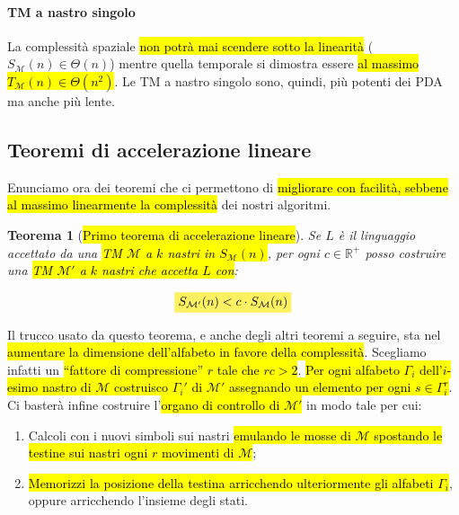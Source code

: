\documentclass[a4paper,11pt,oneside]{article}
\theoremstyle{plain}
\newtheorem{thm}{Teorema}[section]
\theoremstyle{definition}
\theoremstyle{remark}
\newcommand{\mhl}[1]{\colorbox{hlcolor}{$\displaystyle #1$}}
\begin{document}
\paragraph{TM a nastro singolo} La complessità spaziale \hl{non potrà mai
scendere sotto la linearità} ($S_\mathcal{M}(n) \in \Theta(n)$) mentre quella
temporale si dimostra essere \hl{al massimo $T_\mathcal{M}(n) \in \Theta(n^2)$}.
Le TM a nastro singolo sono, quindi, più potenti dei PDA ma anche più lente.

\subsection{Teoremi di accelerazione lineare}\label{sec:acc-lin}

Enunciamo ora dei teoremi che ci permettono di \hl{migliorare con facilità,
sebbene al massimo linearmente la complessità} dei nostri algoritmi.

\begin{thm}[\hl{Primo teorema di accelerazione lineare}]\label{thm:acc-lin-1}
  Se $L$ è il linguaggio accettato da una \hl{TM $\mathcal{M}$ a $k$ nastri in
  $S_\mathcal{M}(n)$}, per ogni $c \in \mathbb{R}^+$ posso costruire una \hl{TM
  $\mathcal{M}'$ a $k$ nastri che accetta $L$ con}:

  \begin{equation}
    \mhl{ S_{\mathcal{M}'}(n) < c \cdot S_\mathcal{M}(n) }
  \end{equation}
\end{thm}

Il trucco usato da questo teorema, e anche degli altri teoremi a seguire, sta
nel \hl{aumentare la dimensione dell'alfabeto in favore della complessità}. Scegliamo
infatti un \hl{``fattore di compressione'' $r$ tale che $rc>2$}. \hl{Per ogni alfabeto
$\Gamma_i$ dell'$i$-esimo nastro di $\mathcal{M}$ costruisco $\Gamma_i'$ di
$\mathcal{M}'$ assegnando un elemento per ogni $s\in\Gamma_i^r$}. Ci basterà
infine costruire l'\hl{organo di controllo di $\mathcal{M}'$} in modo tale per cui:

\begin{enumerate}
  \item Calcoli con i nuovi simboli sui nastri \hl{emulando le mosse di
    $\mathcal{M}$ spostando le testine sui nastri ogni $r$ movimenti di
    $\mathcal{M}$};
  \item \hl{Memorizzi la posizione della testina arricchendo ulteriormente gli
    alfabeti $\Gamma_i$}, oppure arricchendo l'insieme degli stati.
\end{enumerate}
\end{document}
